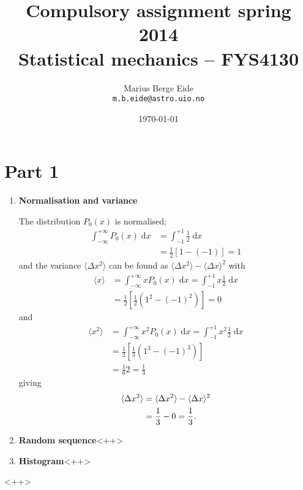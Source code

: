 \documentclass[a4paper,11pt]{article}
\date{\today}
\title{Compulsory assignment spring 2014\\ \small{Statistical mechanics -- FYS4130}}
\author{Marius Berge Eide \\ \texttt{m.b.eide@astro.uio.no}}
\newcommand{\diff}{\ensuremath{\; \text{d}}}
\begin{document}
\onecolumn
\maketitle{}


\section{Part 1}

\begin{enumerate}
    \item \textbf{Normalisation and variance}

        The distribution $P_0(x)$ is normalised;
        \begin{align*}
            \int_{-\infty}^{+\infty} P_0(x) \diff x &= \int_{-1}^{+1} \frac{1}{2} \diff x \\
            &= \frac{1}{2} \left[ 1 - \left( -1 \right) \right] = 1
        \end{align*}
        and the variance $\langle \Delta x^2 \rangle$ can be found as $\langle \Delta x^2 \rangle - \langle \Delta x \rangle^2$ with
        \begin{align*}
            \langle x \rangle &= \int_{-\infty}^{+\infty} x P_0(x) \diff x = \int_{-1}^{+1} x \frac{1}{2} \diff x \\
            &= \frac{1}{2} \left[ \frac{1}{2} \left( 1^2 - (-1)^2 \right) \right] = 0
        \end{align*}
        and
        \begin{align*}
            \langle x^2 \rangle &=  \int_{-\infty}^{+\infty} x^2 P_0(x) \diff x = \int_{-1}^{+1} x^2 \frac{1}{2} \diff x \\
            &= \frac{1}{2} \left[ \frac{1}{3} \left( 1^3 - (-1)^3 \right) \right] \\
            &= \frac{1}{6} 2 = \frac{1}{3}
        \end{align*}
        giving
        \begin{align}
            \langle \Delta x^2 \rangle &= \langle \Delta x^2 \rangle - \langle \Delta x \rangle^2 \notag \\
            &= \frac{1}{3} - 0 = \frac{1}{3}.
            \label{eq:variance1}
        \end{align}

    \item \textbf{Random sequence}<++>

    \item \textbf{Histogram}<++>
\end{enumerate}<++>
\end{document}
